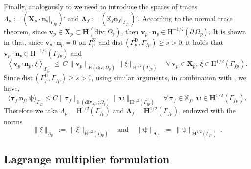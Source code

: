\documentclass[11pt]{article}
\numberwithin{equation}{section}
\newcommand{\bLambda}{{\boldsymbol\Lambda}}
\newcommand{\bpsi}{{\boldsymbol\psi}}
\newcommand{\btau}{{\boldsymbol\tau}}
\newcommand{\bv}{{\mathbf{v}}}
\newcommand{\bn}{{\mathbf{n}}}
\newcommand{\0}{{\mathbf{0}}}
\def\bX{\mathbf{X}}
\newcommand\bH{\mathbf{H}}
\newcommand\bbH{\mathbb{H}}
\newcommand\bbX{\mathbb{X}}
\def\H{\mathrm{H}}
\def\rD{\mathrm{D}}
\def\rN{\mathrm{N}}
\def\bdiv{\mathbf{div}}
\def\div{\mathrm{div}}
\def\dist{\mathrm{dist}\,}
\def\pil{\left<}
\def\pir{\right>}
\numberwithin{equation}{section}
\begin{document}
Finally, analogously to \cite{gmor2014,cgos2017} we need to introduce the spaces of traces $\Lambda_p := (\bX_p\cdot\bn_p|_{\Gamma_{fp}})'$ and $\bLambda_f := (\bbX_f\bn_f|_{\Gamma_{fp}})'$.
According to the normal trace theorem, since $\bv_p\in \bX_p\subset \bH(\div;\Omega_p)$, then $\bv_p\cdot\bn_p\in \H^{-1/2}(\partial\,\Omega_p)$.
It is shown in \cite{akyz2018} that, since $\bv_p\cdot\bn_p = 0$ on $\Gamma^\rN_p$ and $\dist(\Gamma^\rD_p,\Gamma_{fp}) \geq s> 0$, it holds that
$\bv_p\cdot\bn_p\in \H^{-1/2}(\Gamma_{fp})$ and
%
\begin{equation}\label{eq:trace-inequality-1}
\pil \bv_p \cdot \bn_p, \xi \pir_{\Gamma_{fp}} 
\,\leq\, C\,\| \bv_p \|_{\bH(\div; \Omega_p)} \| \xi \|_{\H^{1/2}(\Gamma_{fp})} \quad \forall\,\bv_p \in \bX_p, \, \xi \in \H^{1/2}(\Gamma_{fp}).
\end{equation}
%
Since $\dist(\Gamma^\rD_f,\Gamma_{fp}) \geq s> 0$, 
using similar arguments, in combination with \cite[Lemma~3.5]{cgo2021}, we have,
%
\begin{equation}\label{eq:trace-inequality-2}
\langle \btau_f \, \bn_f,\bpsi \rangle_{\Gamma_{fp}}
\le C \|\btau_f\|_{\bbH(\bdiv_{4/3};\Omega_f)}\|\bpsi\|_{\bH^{1/2}(\Gamma_{fp})}
\quad \forall \, \btau_f \in \bbX_f, \,
\bpsi \in \bH^{1/2}(\Gamma_{fp}).
\end{equation}
%
Therefore we take
%
$\Lambda_p = \H^{1/2}(\Gamma_{fp})$ and $\bLambda_f = \bH^{1/2}(\Gamma_{fp})$,
%
endowed with the norms
%
\begin{equation}\label{eq:H1/2-norms}
\|\xi\|_{\Lambda_p} \,:=\, \|\xi\|_{\H^{1/2}(\Gamma_{fp})} \quad \text{and} \quad
\|\bpsi\|_{\bLambda_f} \,:=\, \|\bpsi\|_{\bH^{1/2}(\Gamma_{fp})}\,.
\end{equation} 


\subsection{Lagrange multiplier formulation}
\end{document}
